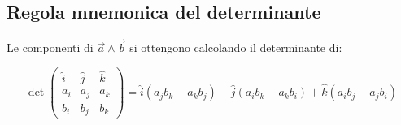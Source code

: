 \documentclass{article}
\begin{document}
\subsection{Regola mnemonica del determinante}

Le componenti di $\vec{a} \wedge \vec{b}$ si ottengono calcolando il determinante di:

$$
\det{
\begin{pmatrix}
\hat{i} & \hat{j} & \hat{k} \\
a_i & a_j & a_k \\
b_i & b_j & b_k
\end{pmatrix}
} = \hat{i} (a_jb_k - a_kb_j) - \hat{j} (a_ib_k - a_kb_i) + \hat{k} (a_ib_j - a_jb_i)
$$
\end{document}
